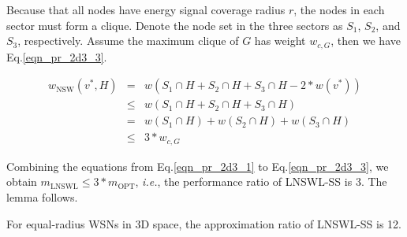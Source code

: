 \documentclass[journal,10pt]{IEEEtran}
\begin{document}
\begin{IEEEproof}
Because that all nodes have energy signal coverage radius $r$, the nodes in each sector must form a clique. Denote the node set in the three sectors as $S_1$, $S_2$, and $S_3$, respectively. Assume the maximum clique of $G$ has weight $w_{c,G}$, then we have Eq.\eqref{eqn_pr_2d3_3}.

\begin{equation}
\label{eqn_pr_2d3_3}
\begin{array}{rcl}
w_\text{NSW}(v^{*},H)&{=}&w(S_1{\cap}H{+}S_2{\cap}H{+}S_3{\cap}H{-}2{*}w(v^{*}))\\
&{\leq}&w(S_1{\cap}H{+}S_2{\cap}H{+}S_3{\cap}H)\\
&{=}&w(S_1{\cap}H){+}w(S_2{\cap}H){+}w(S_3{\cap}H)\\
&{\leq}&3{*}w_{c,G}
\end{array}
\end{equation}

Combining the equations from Eq.\eqref{eqn_pr_2d3_1} to Eq.\eqref{eqn_pr_2d3_3}, we obtain $m_\text{LNSWL}{\leq}3{*}m_\text{OPT}$, \textit{i.e.}, the performance ratio of LNSWL-SS is 3. The lemma follows.
\end{IEEEproof}

\begin{lemma}
\label{lemma_3d_ratio12}
For equal-radius WSNs in 3D space, the approximation ratio of LNSWL-SS is 12.
\end{lemma}
\end{document}
